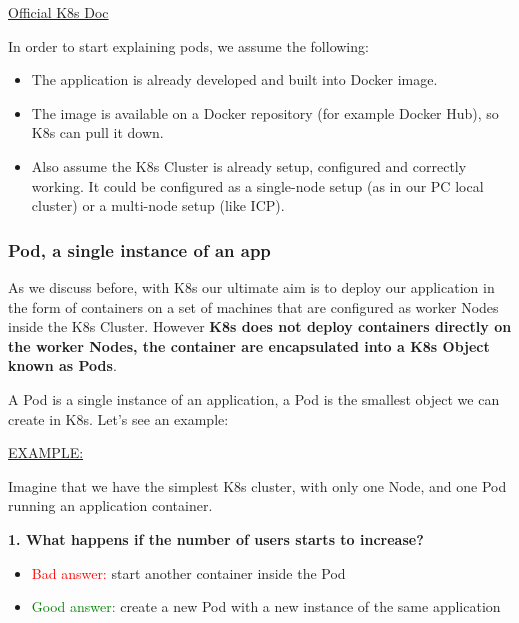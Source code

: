 \documentclass{article}
\newenvironment{blocktemplate}[1]{%
    \tcolorbox[beamer,%
    noparskip,breakable,
    colframe=Blue,%
    colbacklower=LimeGreen!75!LightGreen,%
    title=#1]}%
    {\endtcolorbox}
\begin{document}
\href{https://kubernetes.io/docs/concepts/workloads/pods/}{Official K8s Doc}

\begin{blocktemplate}{Note}
In order to start explaining pods, we assume the following:

\begin{itemize}
    \item The application is already developed and built into Docker image.
    \item The image is available on a Docker repository (for example Docker Hub), so K8s can pull it down.
    \item Also assume the K8s Cluster is already setup, configured and correctly working. It could be configured as a single-node setup (as in our PC local cluster) or a multi-node setup (like ICP).
\end{itemize}
\end{blocktemplate}

\subsubsection{Pod, a single instance of an app}

As we discuss before, with K8s our ultimate aim is to deploy our application in the form of containers on a set of machines that are configured as worker Nodes inside the K8s Cluster. However \textbf{K8s does not deploy containers directly on the worker Nodes, the container are encapsulated into a K8s Object known as Pods}.

A Pod is a single instance of an application, a Pod is the smallest object we can create in K8s. Let's see an example:

\underline{EXAMPLE:}

Imagine that we have the simplest K8s cluster, with only one Node, and one Pod running an application container.

\textbf{1. What happens if the number of users starts to increase?}

\begin{itemize}
    \item \textcolor{red}{Bad answer:} start another container inside the Pod
    \item \textcolor{green}{Good answer:} create a new Pod with a new instance of the same application
\end{itemize}
\end{document}

